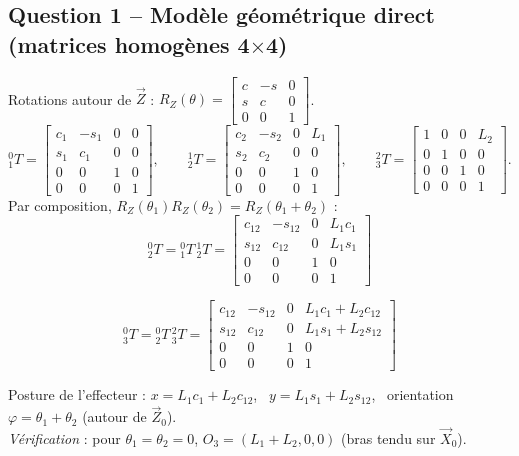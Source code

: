 \documentclass[11pt,a4paper]{article}
\begin{document}
\subsection*{Question 1 -- Modèle géométrique direct (matrices homogènes 4$\times$4)}
Rotations autour de $\vec Z$ : $R_Z(\theta)=\begin{bmatrix}c&-s&0\\s&c&0\\0&0&1\end{bmatrix}$.
\[{}^0_1T=\begin{bmatrix}c_1&-s_1&0&0\\s_1&c_1&0&0\\0&0&1&0\\0&0&0&1\end{bmatrix},\qquad
{}^1_2T=\begin{bmatrix}c_2&-s_2&0&L_1\\s_2&c_2&0&0\\0&0&1&0\\0&0&0&1\end{bmatrix},\qquad
{}^2_3T=\begin{bmatrix}1&0&0&L_2\\0&1&0&0\\0&0&1&0\\0&0&0&1\end{bmatrix}.\]
Par composition, $R_Z(\theta_1)R_Z(\theta_2)=R_Z(\theta_1+\theta_2)$ :
\[{}^0_2T={}^0_1T\,{}^1_2T=\begin{bmatrix}c_{12}&-s_{12}&0&L_1c_1\\s_{12}&c_{12}&0&L_1s_1\\0&0&1&0\\0&0&0&1\end{bmatrix}\]
\begin{res}
\[{}^0_3T={}^0_2T\,{}^2_3T=\begin{bmatrix}c_{12}&-s_{12}&0&L_1c_1+L_2c_{12}\\s_{12}&c_{12}&0&L_1s_1+L_2s_{12}\\0&0&1&0\\0&0&0&1\end{bmatrix}\]
\end{res}
Posture de l'effecteur : $x=L_1c_1+L_2c_{12}$, \ $y=L_1s_1+L_2s_{12}$, \ orientation $\varphi=\theta_1+\theta_2$ (autour de $\vec Z_0$).\\
\emph{Vérification} : pour $\theta_1=\theta_2=0$, $O_3=(L_1+L_2,0,0)$ (bras tendu sur $\vec X_0$).
\end{document}
